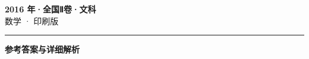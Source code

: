 \documentclass[zihao=5, a4paper]{ctexart}
\begin{document}
\begin{center}
  {\Large\bfseries 2016 年·全国Ⅱ卷·文科}\\[4pt]
  {\large 数学 · 印刷版}
\end{center}
\medskip
{}

\par\bigskip\hrule\bigskip
{}
\begin{center}{\large\bfseries 参考答案与详细解析}\end{center}
\smallskip

\end{document}
